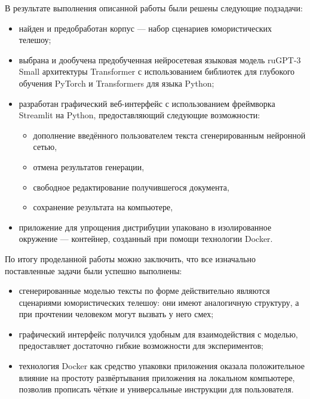 \Conclusion
\label{cha:conclusion}

В результате выполнения описанной работы были решены следующие подзадачи:
\begin{itemize}
    \item найден и предобработан корпус --- набор сценариев юмористических телешоу;
    \item выбрана и дообучена предобученная нейросетевая языковая модель ruGPT-3 Small архитектуры Transformer с использованием библиотек для глубокого обучения PyTorch и Transformers для языка Python;
    \item разработан графический веб-интерфейс с использованием фреймворка Streamlit на Python, предоставляющий следующие возможности:
    \begin{itemize}
        \item дополнение введённого пользователем текста сгенерированным нейронной сетью,
        \item отмена результатов генерации,
        \item свободное редактирование получившегося документа,
        \item сохранение результата на компьютере,
    \end{itemize}
    \item приложение для упрощения дистрибуции упаковано в изолированное окружение --- контейнер, созданный при помощи технологии Docker.
\end{itemize}

По итогу проделанной работы можно заключить, что все изначально поставленные задачи были успешно выполнены:
\begin{itemize}
    \item сгенерированные моделью тексты по форме действительно являются сценариями юмористических телешоу: они имеют аналогичную структуру, а при прочтении человеком могут вызвать у него смех;
    \item графический интерфейс получился удобным для взаимодействия с моделью, предоставляет достаточно гибкие возможности для экспериментов;
    \item технология Docker как средство упаковки приложения оказала положительное влияние на простоту развёртывания приложения на локальном компьютере, позволив прописать чёткие и универсальные инструкции для пользователя.
\end{itemize}
